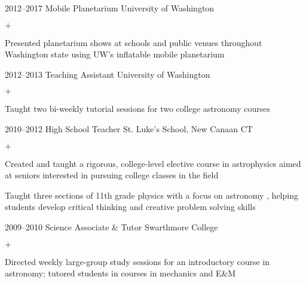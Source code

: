 \documentclass[]{luger-cv} %
\begin{document}
\begin{entrylist}


\entry
{2012--2017}
{Mobile Planetarium}
{University of Washington}
{%
\vspace{-1em}
\begin{list}{$+$}{\cvlist}
\item Presented planetarium shows at schools and public venues throughout
Washington state using UW's inflatable mobile planetarium
\end{list}
}


\entry
{2012--2013}
{Teaching Assistant}
{University of Washington}
{%
\vspace{-1em}
\begin{list}{$+$}{\cvlist}
\item Taught two bi-weekly tutorial sessions for two college astronomy courses
\end{list}
}


\ifdefined \onepage \else
\end{entrylist}
%
%
\begin{entrylist}
\fi


\entry
{2010--2012}
{High School Teacher}
{St. Luke's School, New Canaan CT}
{%
\vspace{-1em}
\begin{list}{$+$}{\cvlist}
\item Created and taught a rigorous, college-level elective course in astrophysics
aimed at seniors interested in pursuing college classes in the field
\item Taught three sections of 11th grade physics with a focus on
astronomy
\ifdefined \onepage \else
, helping students develop critical thinking and creative
problem solving skills
\fi
\end{list}
}

%

\ifdefined \onepage \else
\entry
{2009--2010}
{Science Associate \& Tutor}
{Swarthmore College}
{%
\vspace{-1em}
\begin{list}{$+$}{\cvlist}
\item Directed weekly large-group study sessions for an introductory course in
astronomy; tutored students in courses in mechanics and E\&M
\end{list}
}
\fi


\end{entrylist}
\end{document}
